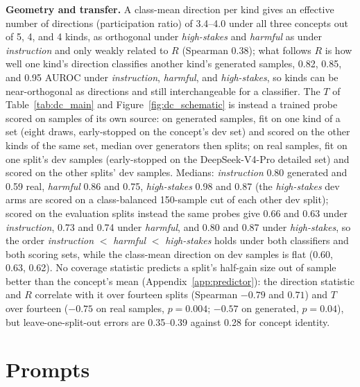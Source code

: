 \documentclass{article} %
\newcommand{\hs}{\emph{high-stakes}}
\newcommand{\harm}{\emph{harmful}}
\newcommand{\instr}{\emph{instruction}}
\begin{document}
\textbf{Geometry and transfer.} A class-mean direction per kind gives an effective number of directions (participation ratio) of 3.4--4.0 under all three concepts out of 5, 4, and 4 kinds, as orthogonal under \hs{} and \harm{} as under \instr{} and only weakly related to $R$ (Spearman 0.38); what follows $R$ is how well one kind's direction classifies another kind's generated samples, 0.82, 0.85, and 0.95 AUROC under \instr{}, \harm{}, and \hs{}, so kinds can be near-orthogonal as directions and still interchangeable for a classifier. The $T$ of Table~\ref{tab:dc_main} and Figure~\ref{fig:dc_schematic} is instead a trained probe scored on samples of its own source: on generated samples, fit on one kind of a set (eight draws, early-stopped on the concept's dev set) and scored on the other kinds of the same set, median over generators then splits; on real samples, fit on one split's dev samples (early-stopped on the DeepSeek-V4-Pro detailed set) and scored on the other splits' dev samples. Medians: \instr{} 0.80 generated and 0.59 real, \harm{} 0.86 and 0.75, \hs{} 0.98 and 0.87 (the \hs{} dev arms are scored on a class-balanced 150-sample cut of each other dev split); scored on the evaluation splits instead the same probes give 0.66 and 0.63 under \instr{}, 0.73 and 0.74 under \harm{}, and 0.80 and 0.87 under \hs{}, so the order \instr{} $<$ \harm{} $<$ \hs{} holds under both classifiers and both scoring sets, while the class-mean direction on dev samples is flat (0.60, 0.63, 0.62). No coverage statistic predicts a split's half-gain size out of sample better than the concept's mean (Appendix~\ref{app:predictor}): the direction statistic and $R$ correlate with it over fourteen splits (Spearman $-0.79$ and $0.71$) and $T$ over fourteen ($-0.75$ on real samples, $p=0.004$; $-0.57$ on generated, $p=0.04$), but leave-one-split-out errors are 0.35--0.39 against 0.28 for concept identity.

\section{Prompts}
\label{app:prompts}
\end{document}

